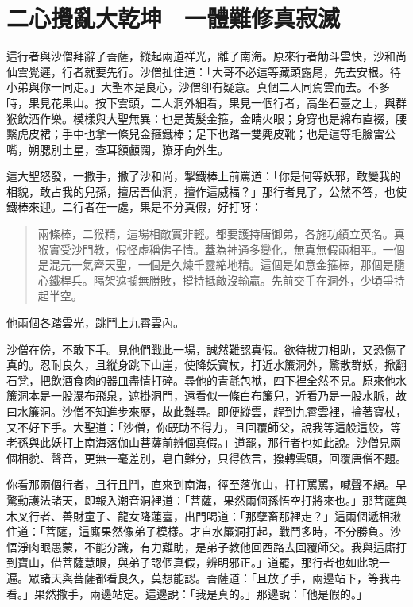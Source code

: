 
\chapter{二心攪亂大乾坤　一體難修真寂滅}

這行者與沙僧拜辭了菩薩，縱起兩道祥光，離了南海。原來行者觔斗雲快，沙和尚仙雲覺遲，行者就要先行。沙僧扯住道：「大哥不必這等藏頭露尾，先去安根。待小弟與你一同走。」大聖本是良心，沙僧卻有疑意。真個二人同駕雲而去。不多時，果見花果山。按下雲頭，二人洞外細看，果見一個行者，高坐石臺之上，與群猴飲酒作樂。模樣與大聖無異：也是黃髮金箍，金睛火眼；身穿也是綿布直裰，腰繫虎皮裙；手中也拿一條兒金箍鐵棒；足下也踏一雙麂皮靴；也是這等毛臉雷公嘴，朔腮別土星，查耳額顱闊，獠牙向外生。

這大聖怒發，一撒手，撇了沙和尚，掣鐵棒上前罵道：「你是何等妖邪，敢變我的相貌，敢占我的兒孫，擅居吾仙洞，擅作這威福？」那行者見了，公然不答，也使鐵棒來迎。二行者在一處，果是不分真假，好打呀：
\begin{quote}
兩條棒，二猴精，這場相敵實非輕。都要護持唐御弟，各施功績立英名。真猴實受沙門教，假怪虛稱佛子情。蓋為神通多變化，無真無假兩相平。一個是混元一氣齊天聖，一個是久煉千靈縮地精。這個是如意金箍棒，那個是隨心鐵桿兵。隔架遮攔無勝敗，撐持抵敵沒輸贏。先前交手在洞外，少頃爭持起半空。
\end{quote}

他兩個各踏雲光，跳鬥上九霄雲內。

沙僧在傍，不敢下手。見他們戰此一場，誠然難認真假。欲待拔刀相助，又恐傷了真的。忍耐良久，且縱身跳下山崖，使降妖寶杖，打近水簾洞外，驚散群妖，掀翻石凳，把飲酒食肉的器皿盡情打碎。尋他的青氈包袱，四下裡全然不見。原來他水簾洞本是一股瀑布飛泉，遮掛洞門，遠看似一條白布簾兒，近看乃是一股水脈，故曰水簾洞。沙僧不知進步來歷，故此難尋。即便縱雲，趕到九霄雲裡，掄著寶杖，又不好下手。大聖道：「沙僧，你既助不得力，且回覆師父，說我等這般這般，等老孫與此妖打上南海落伽山菩薩前辨個真假。」道罷，那行者也如此說。沙僧見兩個相貌、聲音，更無一毫差別，皂白難分，只得依言，撥轉雲頭，回覆唐僧不題。

你看那兩個行者，且行且鬥，直來到南海，徑至落伽山，打打罵罵，喊聲不絕。早驚動護法諸天，即報入潮音洞裡道：「菩薩，果然兩個孫悟空打將來也。」那菩薩與木叉行者、善財童子、龍女降蓮臺，出門喝道：「那孽畜那裡走？」這兩個遞相揪住道：「菩薩，這廝果然像弟子模樣。才自水簾洞打起，戰鬥多時，不分勝負。沙悟淨肉眼愚蒙，不能分識，有力難助，是弟子教他回西路去回覆師父。我與這廝打到寶山，借菩薩慧眼，與弟子認個真假，辨明邪正。」道罷，那行者也如此說一遍。眾諸天與菩薩都看良久，莫想能認。菩薩道：「且放了手，兩邊站下，等我再看。」果然撒手，兩邊站定。這邊說：「我是真的。」那邊說：「他是假的。」

